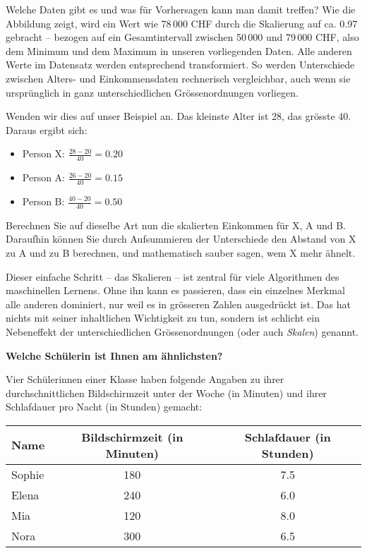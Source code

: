 \begin{lpu}{Welche Daten gibt es und was für Vorhersagen kann man damit treffen?}
Wie die Abbildung zeigt, wird ein Wert wie 78\,000 CHF durch die Skalierung auf ca. 0.97 gebracht – bezogen auf ein Gesamtintervall zwischen 50\,000 und 79\,000 CHF, also dem Minimum und dem Maximum in unseren vorliegenden Daten. Alle anderen Werte im Datensatz werden entsprechend transformiert. So werden Unterschiede zwischen Alters- und Einkommensdaten rechnerisch vergleichbar, auch wenn sie ursprünglich in ganz unterschiedlichen Grössenordnungen vorliegen.

Wenden wir dies auf unser Beispiel an. Das kleinste Alter ist 28, das grösste 40. Daraus ergibt sich:

\begin{itemize}
  \item Person X: $\frac{28 - 20}{40} = 0.20$
  \item Person A: $\frac{26 - 20}{40} = 0.15$
  \item Person B: $\frac{40 - 20}{40} = 0.50$
\end{itemize}

\begin{aufgabe}{4}
    Berechnen Sie auf dieselbe Art nun die skalierten Einkommen für X, A und B. Daraufhin können Sie durch Aufsummieren der Unterschiede den Abstand von X zu A und zu B berechnen, und mathematisch sauber sagen, wem X mehr ähnelt.
\end{aufgabe}

Dieser einfache Schritt – das Skalieren – ist zentral für viele Algorithmen des maschinellen Lernens. Ohne ihn kann es passieren, dass ein einzelnes Merkmal alle anderen dominiert, nur weil es in grösseren Zahlen ausgedrückt ist. Das hat nichts mit seiner inhaltlichen Wichtigkeit zu tun, sondern ist schlicht ein Nebeneffekt der unterschiedlichen Grössenordnungen (oder auch \textit{Skalen}) genannt.

\begin{aufgabe}{5}
\textbf{Welche Schülerin ist Ihnen am ähnlichsten?}

Vier Schülerinnen einer Klasse haben folgende Angaben zu ihrer durchschnittlichen Bildschirmzeit unter der Woche (in Minuten) und ihrer Schlafdauer pro Nacht (in Stunden) gemacht:

\begin{center}
\begin{tabular}{|l|c|c|}
\hline
\textbf{Name} & \textbf{Bildschirmzeit} (in Minuten) & \textbf{Schlafdauer} (in Stunden) \\
\hline
Sophie & 180 & 7.5 \\
Elena  & 240 & 6.0 \\
Mia    & 120 & 8.0 \\
Nora   & 300 & 6.5 \\
\hline
\end{tabular}
\end{center}


\end{aufgabe}
\end{lpu}
